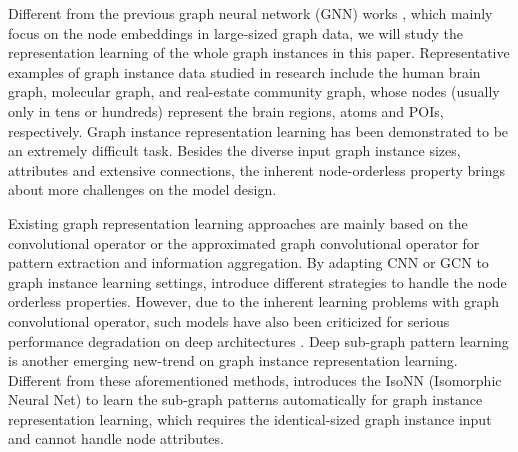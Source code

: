 \documentclass{article}
\begin{document}
Different from the previous graph neural network (GNN) works \cite{zhang2020graph,Velickovic_Graph_ICLR_18,Kipf_Semi_CORR_16}, which mainly focus on the node embeddings in large-sized graph data, we will study the representation learning of the whole graph instances in this paper. Representative examples of graph instance data studied in research include the human brain graph, molecular graph, and real-estate community graph, whose nodes (usually only in tens or hundreds) represent the brain regions, atoms and POIs, respectively. Graph instance representation learning has been demonstrated to be an extremely difficult task. Besides the diverse input graph instance sizes, attributes and extensive connections, the inherent node-orderless property \cite{Meng_Isomorphic_NIPS_19} brings about more challenges on the model design. 

Existing graph representation learning approaches are mainly based on the convolutional operator \cite{NIPS2012_4824} or the approximated graph convolutional operator \cite{Hammond_2011,NIPS2016_6081} for pattern extraction and information aggregation. By adapting CNN \cite{NIPS2012_4824} or GCN \cite{Kipf_Semi_CORR_16} to graph instance learning settings, \cite{Niepert_Learning_16,verma2018graph,Zhang2018AnED,xinyi2018capsule,Chen_Dual_19} introduce different strategies to handle the node orderless properties. However, due to the inherent learning problems with graph convolutional operator, such models have also been criticized for serious performance degradation on deep architectures \cite{zhang2019gresnet}. Deep sub-graph pattern learning \cite{Meng_Isomorphic_NIPS_19} is another emerging new-trend on graph instance representation learning. Different from these aforementioned methods, \cite{Meng_Isomorphic_NIPS_19} introduces the IsoNN (Isomorphic Neural Net) to learn the sub-graph patterns automatically for graph instance representation learning, which requires the identical-sized graph instance input and cannot handle node attributes.
\end{document}
